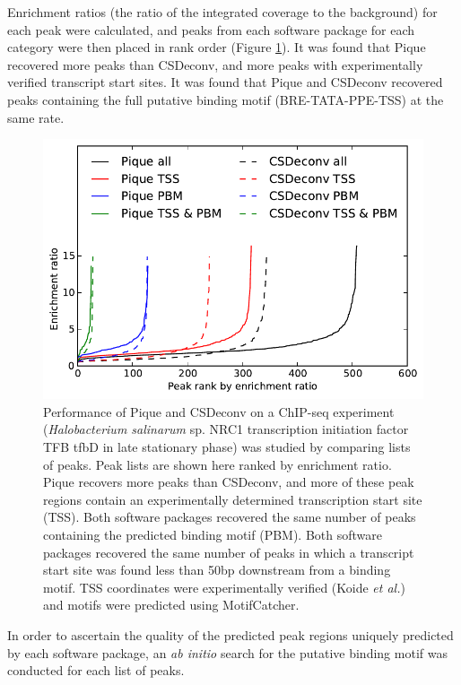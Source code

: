 Enrichment ratios (the ratio of the integrated coverage to the
background) for each peak were calculated, and peaks from each
software package for each category were then placed in rank order
(Figure \ref{P_ranked_peaks}). It was found that Pique recovered more
peaks than CSDeconv, and more peaks with experimentally verified
transcript start sites. It was found that Pique and CSDeconv recovered
peaks containing the full putative binding motif (BRE-TATA-PPE-TSS) at
the same rate.

\begin{figure}
  \begin{center}
  \includegraphics{pique/figures/pique_csd_ranks.pdf}
  \end{center}
  \caption{Performance of Pique and CSDeconv on a ChIP-seq experiment
    ({\em Halobacterium salinarum} sp. NRC1 transcription initiation
    factor TFB tfbD in late stationary phase) was studied by comparing
    lists of peaks. Peak lists are shown here ranked by enrichment
    ratio. Pique recovers more peaks than CSDeconv, and more of these
    peak regions contain an experimentally determined transcription
    start site (TSS). Both software packages recovered the same number
    of peaks containing the predicted binding motif (PBM). Both
    software packages recovered the same number of peaks in which a
    transcript start site was found less than 50bp downstream from a
    binding motif. TSS coordinates were experimentally verified (Koide
    {\em et al.}) \cite{halo_promoters} and motifs were predicted
    using MotifCatcher. \cite{Seitzer_2012}}\label{P_ranked_peaks}
\end{figure}

In order to ascertain the quality of the predicted peak regions
uniquely predicted by each software package, an {\em ab initio} search
for the putative binding motif was conducted for each list of peaks. 

